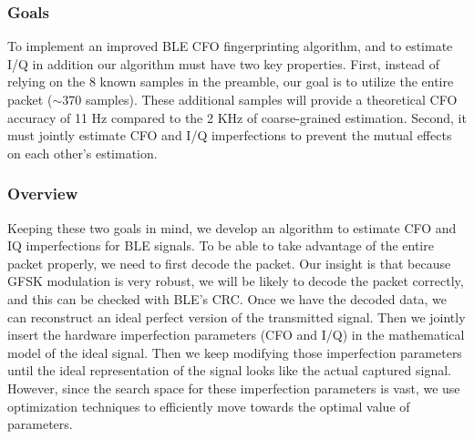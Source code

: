 %
%

\subsubsection{Goals}
%
To implement an improved BLE CFO fingerprinting algorithm, and to estimate I/Q
in addition our algorithm must have two key properties.
%
First, instead of relying on the 8 known samples in the preamble, our goal is
to utilize the entire packet ($\sim$370 samples).
These additional samples will provide a theoretical CFO accuracy of 
11 Hz compared to the 2 KHz of coarse-grained
estimation.
%
Second, it must jointly estimate CFO and I/Q imperfections to prevent the
mutual effects on each other's estimation.

\subsubsection{Overview}
%
Keeping these two goals in mind, we develop an algorithm to estimate CFO and IQ
imperfections for BLE signals.
%
To be able to take advantage of the entire packet properly, we need to first
decode the packet. Our insight is that because GFSK modulation is very robust,
we will be likely to decode the packet correctly, and this can be checked with
BLE's CRC.
%
Once we have the decoded data, we can reconstruct an ideal perfect version of
the transmitted signal.
%
Then we jointly insert the hardware imperfection parameters (CFO and I/Q) in the
mathematical model of the ideal signal. Then we keep modifying those
imperfection parameters until the ideal representation of the signal
looks like the actual captured signal. However, since the search space for
these imperfection parameters is vast, we use optimization techniques to
efficiently move towards the optimal value of parameters.


